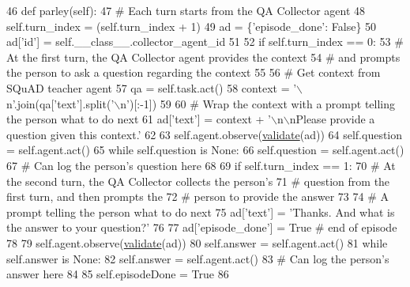 \begin{DoxyCode}
46     \textcolor{keyword}{def }parley(self):
47         \textcolor{comment}{# Each turn starts from the QA Collector agent}
48         self.turn\_index = (self.turn\_index + 1) %
49         ad = \{\textcolor{stringliteral}{'episode\_done'}: \textcolor{keyword}{False}\}
50         ad[\textcolor{stringliteral}{'id'}] = self.\_\_class\_\_.collector\_agent\_id
51 
52         \textcolor{keywordflow}{if} self.turn\_index == 0:
53             \textcolor{comment}{# At the first turn, the QA Collector agent provides the context}
54             \textcolor{comment}{# and prompts the person to ask a question regarding the context}
55 
56             \textcolor{comment}{# Get context from SQuAD teacher agent}
57             qa = self.task.act()
58             context = \textcolor{stringliteral}{'\(\backslash\)n'}.join(qa[\textcolor{stringliteral}{'text'}].split(\textcolor{stringliteral}{'\(\backslash\)n'})[:-1])
59 
60             \textcolor{comment}{# Wrap the context with a prompt telling the person what to do next}
61             ad[\textcolor{stringliteral}{'text'}] = context + \textcolor{stringliteral}{'\(\backslash\)n\(\backslash\)nPlease provide a question given this context.'}
62 
63             self.agent.observe(\hyperlink{namespaceparlai_1_1core_1_1worlds_afc3fad603b7bce41dbdc9cdc04a9c794}{validate}(ad))
64             self.question = self.agent.act()
65             \textcolor{keywordflow}{while} self.question \textcolor{keywordflow}{is} \textcolor{keywordtype}{None}:
66                 self.question = self.agent.act()
67             \textcolor{comment}{# Can log the person's question here}
68 
69         \textcolor{keywordflow}{if} self.turn\_index == 1:
70             \textcolor{comment}{# At the second turn, the QA Collector collects the person's}
71             \textcolor{comment}{# question from the first turn, and then prompts the}
72             \textcolor{comment}{# person to provide the answer}
73 
74             \textcolor{comment}{# A prompt telling the person what to do next}
75             ad[\textcolor{stringliteral}{'text'}] = \textcolor{stringliteral}{'Thanks. And what is the answer to your question?'}
76 
77             ad[\textcolor{stringliteral}{'episode\_done'}] = \textcolor{keyword}{True}  \textcolor{comment}{# end of episode}
78 
79             self.agent.observe(\hyperlink{namespaceparlai_1_1core_1_1worlds_afc3fad603b7bce41dbdc9cdc04a9c794}{validate}(ad))
80             self.answer = self.agent.act()
81             \textcolor{keywordflow}{while} self.answer \textcolor{keywordflow}{is} \textcolor{keywordtype}{None}:
82                 self.answer = self.agent.act()
83             \textcolor{comment}{# Can log the person's answer here}
84 
85             self.episodeDone = \textcolor{keyword}{True}
86 
\end{DoxyCode}
